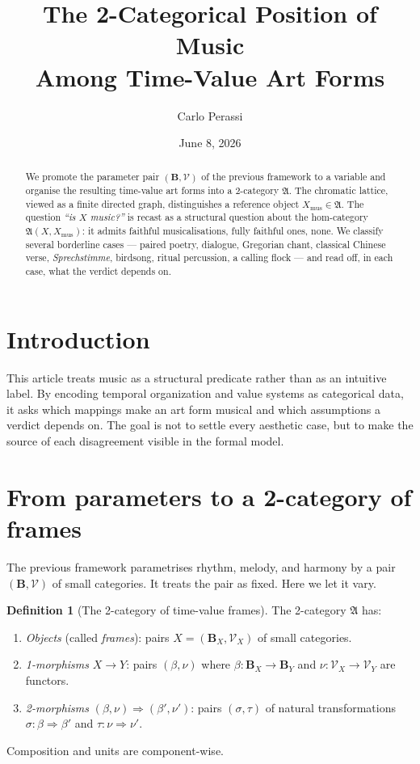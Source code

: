 \documentclass[11pt]{article}
\title{The 2-Categorical Position of Music\\
Among Time-Value Art Forms}
\author{Carlo Perassi}
\date{June 8, 2026}
\theoremstyle{definition}
\newtheorem{definition}{Definition}[section]
\theoremstyle{plain}
\theoremstyle{remark}
\newcommand{\B}{\mathbf{B}}
\newcommand{\V}{\mathcal{V}}
\newcommand{\Frame}{\mathfrak{A}}
\newcommand{\Xmus}{X_{\mathrm{mus}}}
\begin{document}
\maketitle

\begin{abstract}
\noindent We promote the parameter pair $(\B, \V)$ of the previous
framework to a variable and organise the resulting time-value art
forms into a 2-category $\Frame$. The chromatic lattice, viewed as a
finite directed graph, distinguishes a reference object
$\Xmus \in \Frame$. The question \emph{``is $X$ music?''} is
recast as a structural question about the hom-category
$\Frame(X, \Xmus)$: it admits faithful musicalisations, fully
faithful ones, none. We classify several borderline cases — paired
poetry, dialogue, Gregorian chant, classical Chinese verse,
\emph{Sprechstimme}, birdsong, ritual percussion, a calling flock —
and read off, in each case, what the verdict depends on.
\end{abstract}

\section{Introduction}

This article treats music as a structural predicate rather than as an intuitive
label. By encoding temporal organization and value systems as categorical data,
it asks which mappings make an art form musical and which assumptions a verdict
depends on. The goal is not to settle every aesthetic case, but to make the
source of each disagreement visible in the formal model.

\section{From parameters to a 2-category of frames}

The previous framework parametrises rhythm, melody, and harmony by a
pair $(\B, \V)$ of small categories. It treats the pair as fixed.
Here we let it vary.

\begin{definition}[The 2-category of time-value frames]\label{def:frames}
The 2-category $\Frame$ has:
\begin{enumerate}[label=\textup{(\roman*)}, leftmargin=2em]
\item \emph{Objects} (called \emph{frames}): pairs
$X = (\B_X, \V_X)$ of small categories.
\item \emph{1-morphisms} $X \to Y$: pairs
$(\beta, \nu)$ where $\beta : \B_X \to \B_Y$ and $\nu : \V_X \to \V_Y$
are functors.
\item \emph{2-morphisms} $(\beta, \nu) \Rightarrow (\beta', \nu')$:
pairs $(\sigma, \tau)$ of natural transformations
$\sigma : \beta \Rightarrow \beta'$ and $\tau : \nu \Rightarrow \nu'$.
\end{enumerate}
Composition and units are component-wise.
\end{definition}
\end{document}

